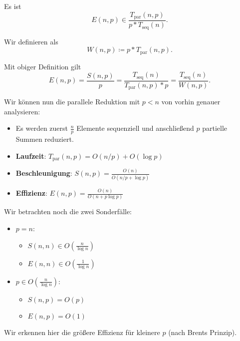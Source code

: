 Es ist
\begin{equation*}
  E(n,p) \in \frac{T_\text{par}(n,p)}{p*T_\text{seq}(n)}\text{.}
\end{equation*}

\begin{definition}[Arbeit]
  Wir definieren  als
  \begin{equation*}
    W(n,p) \coloneqq p*T_\text{par}(n,p) \text{.}
  \end{equation*}
\end{definition}

Mit obiger Definition gilt
\begin{equation*}
  E(n,p) = \frac{S(n,p)}{p} = \frac{T_\text{seq}(n)}{T_\text{par}(n,p)*p} = \frac{T_\text{seq}(n)}{W(n,p)}\text{.}
\end{equation*}

Wir können nun die parallele Reduktion mit \( p < n \) von vorhin genauer analysieren:
\begin{itemize}
  \item Es werden zuerst \( \tfrac{n}{p} \) Elemente sequenziell und anschließend \( p \) partielle Summen reduziert.
  \item \textbf{Laufzeit}: \( T_\text{par}(n,p) = O(n/p) + O(\log p) \)
  \item \textbf{Beschleunigung}: \( S(n,p) = \frac{O(n)}{O(n/p + \log p)} \)
  \item \textbf{Effizienz}: \( E(n,p) = \frac{O(n)}{O(n+p\log p)} \)
\end{itemize}

Wir betrachten noch die zwei Sonderfälle:
\begin{itemize}
  \item \( p = n \):
  \begin{itemize}
    \item \( S(n,n) \in O\left( \frac{n}{\log n} \right) \)
    \item \( E(n,n) \in O\left( \frac{1}{\log n} \right) \)
  \end{itemize}
  \item \( p \in O\left( \frac{n}{\log n} \right) \):
  \begin{itemize}
    \item \( S(n,p) = O(p) \)
    \item \( E(n,p) = O(1) \)
  \end{itemize}
\end{itemize}

Wir erkennen hier die größere Effizienz für kleinere \( p \) (nach Brents Prinzip).